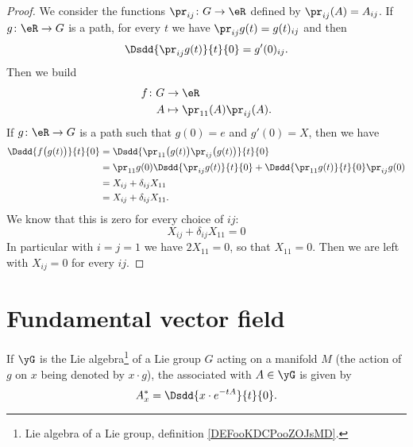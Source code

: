 \begin{proof}
	We consider the functions \( \pr_{ij}\colon G\to \eR\) defined by \( \pr_{ij}(A)=A_{ij}\). If \( g\colon \eR\to G\) is a path, for every \( t\) we have \( \pr_{ij}g(t)=g(t)_{ij}\) and then
	\begin{equation}
		\Dsdd{ \pr_{ij}g(t) }{t}{0}=g'(0)_{ij}.
	\end{equation}
	Then we build
	\begin{equation}
		\begin{aligned}
			f\colon G & \to \eR                         \\
			A         & \mapsto \pr_{11}(A)\pr_{ij}(A).
		\end{aligned}
	\end{equation}
	If \( g\colon \eR\to G\) is a path such that \( g(0)=e\) and \( g'(0)=X\), then we have
	\begin{subequations}
		\begin{align}
			\Dsdd{ f\big( g(t) \big) }{t}{0} & =\Dsdd{ \pr_{11}\big( g(t) \big)\pr_{ij}\big( g(t) \big) }{t}{0}                 \\
			                                 & =\pr_{11}g(0)\Dsdd{ \pr_{ij}g(t) }{t}{0}+\Dsdd{ \pr_{11}g(t) }{t}{0}\pr_{ij}g(0) \\
			                                 & =X_{ij}+\delta_{ij}X_{11}                                                        \\
			                                 & =X_{ij}+\delta_{ij}X_{11}.
		\end{align}
	\end{subequations}
	We know that this is zero for every choice of \( ij\):
	\begin{equation}
		X_{ij}+\delta_{ij}X_{11}=0
	\end{equation}
	In particular with \( i=j=1\) we have \( 2X_{11}=0\), so that \( X_{11}=0\). Then we are left with \( X_{ij}=0\) for every \( ij\).
\end{proof}

\section{Fundamental vector field}\label{sec:fond_vec}

\begin{definition}
	If $\yG$ is the Lie algebra\footnote{Lie algebra of a Lie group, definition \ref{DEFooKDCPooZOJsMD}.} of a Lie group $G$ acting on a manifold $M$ (the action of $g$ on $x$ being denoted by $x\cdot g$), the  associated with $A\in\yG$ is given by
	\begin{equation}			\label{EqDefChmpFond}
		A^*_x=\Dsdd{ x\cdot e^{-tA} }{t}{0}.
	\end{equation}
\end{definition}

